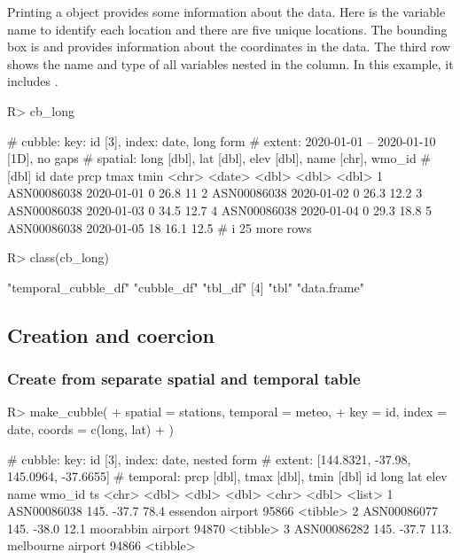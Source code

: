 \documentclass[
  shortnames]{jss}
\begin{document}
Printing a  object provides some information about the data. Here  is the variable name to identify each location and there are five unique locations. The bounding box is \code{[115.97, -32.94, 133.55, -12.42]} and provides information about the coordinates in the data. The third row shows the name and type of all variables nested in the  column. In this example, it includes .

\begin{CodeChunk}
\begin{CodeInput}
R> cb_long
\end{CodeInput}
\begin{CodeOutput}
# cubble:  key: id [3], index: date, long form
# extent:  2020-01-01 -- 2020-01-10 [1D], no gaps
# spatial: long [dbl], lat [dbl], elev [dbl], name [chr], wmo_id
#   [dbl]
  id          date        prcp  tmax  tmin
  <chr>       <date>     <dbl> <dbl> <dbl>
1 ASN00086038 2020-01-01     0  26.8  11  
2 ASN00086038 2020-01-02     0  26.3  12.2
3 ASN00086038 2020-01-03     0  34.5  12.7
4 ASN00086038 2020-01-04     0  29.3  18.8
5 ASN00086038 2020-01-05    18  16.1  12.5
# i 25 more rows
\end{CodeOutput}
\begin{CodeInput}
R> class(cb_long)
\end{CodeInput}
\begin{CodeOutput}
[1] "temporal_cubble_df" "cubble_df"          "tbl_df"            
[4] "tbl"                "data.frame"        
\end{CodeOutput}
\end{CodeChunk}

\hypertarget{create}{%
\subsection{Creation and coercion}\label{create}}

\hypertarget{create-from-separate-spatial-and-temporal-table}{%
\subsubsection{Create from separate spatial and temporal table}\label{create-from-separate-spatial-and-temporal-table}}

\begin{CodeChunk}
\begin{CodeInput}
R> make_cubble(
+   spatial = stations, temporal = meteo,
+   key = id, index = date, coords = c(long, lat)
+   )
\end{CodeInput}
\begin{CodeOutput}
# cubble:   key: id [3], index: date, nested form
# extent:   [144.8321, -37.98, 145.0964, -37.6655]
# temporal: prcp [dbl], tmax [dbl], tmin [dbl]
  id           long   lat  elev name              wmo_id ts      
  <chr>       <dbl> <dbl> <dbl> <chr>              <dbl> <list>  
1 ASN00086038  145. -37.7  78.4 essendon airport   95866 <tibble>
2 ASN00086077  145. -38.0  12.1 moorabbin airport  94870 <tibble>
3 ASN00086282  145. -37.7 113.  melbourne airport  94866 <tibble>
\end{CodeOutput}
\end{CodeChunk}
\end{document}
